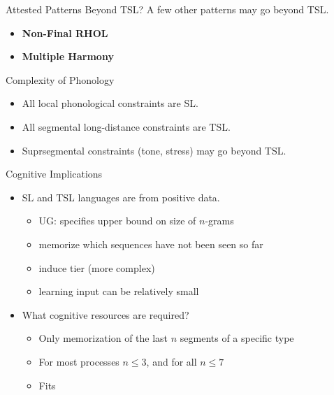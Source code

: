 \documentclass[xcolor={usenames,svgnames,x11names,table}]{beamer}
\begin{document}
\begin{frame}{Attested Patterns Beyond TSL?}
    A few other patterns may go beyond TSL.
    \begin{itemize}
        \item \textbf{Non-Final RHOL} \\
        \item \textbf{Multiple Harmony} \\
    \end{itemize}
\end{frame}

\begin{frame}{Complexity of Phonology}
    \begin{itemize}
        \item All local phonological constraints are SL\@.
        \item All segmental long-distance constraints are TSL\@.\\
        \item Suprsegmental constraints (tone, stress) may go beyond TSL\@.\\
    \end{itemize}
\end{frame}

\begin{frame}{Cognitive Implications}
    \begin{itemize}
        \item SL and TSL languages are  from positive data.\\
            \begin{itemize}
                \item UG: specifies upper bound on size of $n$-grams
                \item memorize which sequences have not been seen so far
                \item induce tier (more complex)
                \item learning input can be relatively small
            \end{itemize}
        \item What cognitive resources are required?\\
            \begin{itemize}
                \item Only memorization of the last $n$ segments of a specific type
                \item For most processes $n \leq 3$, and for all $n \leq 7$
                \item Fits 
            \end{itemize}

    \end{itemize}
\end{frame}
\end{document}
